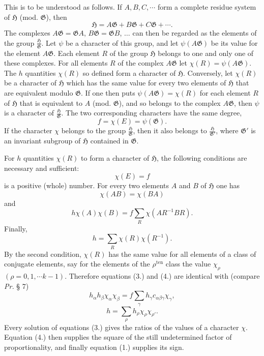 \documentclass[11pt]{article}
\newcommand{\Hgrp}{\mathfrak{H}}
\newcommand{\Ggrp}{\mathfrak{G}}
\newcommand{\ten}{\mathrm{ten}}
\begin{document}
This is to be understood as follows. If $A,B,C,\cdots$ form a complete residue system of $\Hgrp$ (mod. $\Ggrp$), then
\[
\Hgrp=A\Ggrp+B\Ggrp+C\Ggrp+\cdots.
\]
The complexes $A\Ggrp=\Ggrp A$, $B\Ggrp=\Ggrp B$, $\ldots$ can then be regarded as the elements of the group $\frac{\Hgrp}{\Ggrp}$. Let $\psi$ be a character of this group, and let $\psi(A\Ggrp)$ be its value for the element $A\Ggrp$. Each element $R$ of the group $\Hgrp$ belongs to one and only one of these complexes. For all elements $R$ of the complex $A\Ggrp$ let $\chi(R)=\psi(A\Ggrp)$. The $h$ quantities $\chi(R)$ so defined form a character of $\Hgrp$. Conversely, let $\chi(R)$ be a character of $\Hgrp$ which has the same value for every two elements of $\Hgrp$ that are equivalent modulo $\Ggrp$. If one then puts $\psi(A\Ggrp)=\chi(R)$ for each element $R$ of $\Hgrp$ that is equivalent to $A$ (mod. $\Ggrp$), and so belongs to the complex $A\Ggrp$, then $\psi$ is a character of $\frac{\Hgrp}{\Ggrp}$. The two corresponding characters have the same degree,
\[
f=\chi(E)=\psi(\Ggrp).
\]
If the character $\chi$ belongs to the group $\frac{\Hgrp}{\Ggrp}$, then it also belongs to $\frac{\Hgrp}{\Ggrp'}$, where $\Ggrp'$ is an invariant subgroup of $\Hgrp$ contained in $\Ggrp$.

For $h$ quantities $\chi(R)$ to form a character of $\Hgrp$, the following conditions are necessary and sufficient:
\begin{equation}\tag{1.}
\chi(E)=f
\end{equation}
is a positive (whole) number. For every two elements $A$ and $B$ of $\Hgrp$ one has
\begin{equation}\tag{2.}
\chi(AB)=\chi(BA)
\end{equation}
and
\begin{equation}\tag{3.}
h\chi(A)\chi(B)=f\sum_R\chi(AR^{-1}BR).
\end{equation}
Finally,
\begin{equation}\tag{4.}
h=\sum_R\chi(R)\chi(R^{-1}).
\end{equation}
By the second condition, $\chi(R)$ has the same value for all elements of a class of conjugate elements, say for the elements of the $\rho^{\ten}$ class the value $\chi_\rho$ $(\rho=0,1,\cdots k-1)$. Therefore equations (3.) and (4.) are identical with (compare \emph{Pr.} § 7)
\begin{equation}\tag{3.}
h_\alpha h_\beta\chi_\alpha\chi_\beta=f\sum_\gamma h_\gamma c_{\alpha\beta\gamma}\chi_\gamma,
\end{equation}
\begin{equation}\tag{4.}
h=\sum_\rho h_\rho\chi_\rho\chi_{\rho'}.
\end{equation}
Every solution of equations (3.) gives the ratios of the values of a character $\chi$. Equation (4.) then supplies the square of the still undetermined factor of proportionality, and finally equation (1.) supplies its sign.
\end{document}
